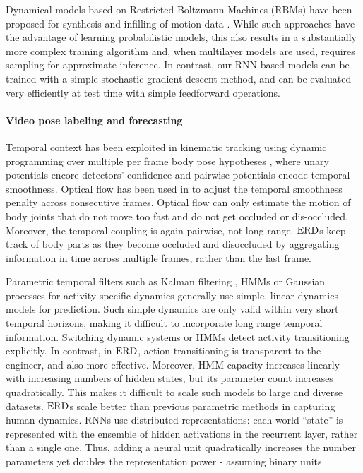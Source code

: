 \documentclass[10pt,twocolumn,letterpaper]{article}
\begin{document}
Dynamical models based on Restricted Boltzmann Machines (RBMs) have been proposed for synthesis and infilling of motion data \cite{thr-mhmub-06,sht-rtrbm-08,th-fcrbm-09,DBLP:conf/cvpr/TaylorSFH10}. While such approaches have the advantage of learning probabilistic models, this also results in a substantially more complex training algorithm and, when multilayer models are used, requires sampling for approximate inference. In contrast, our RNN-based models can be trained with a simple stochastic gradient descent method, and can be evaluated very efficiently at test time with simple feedforward operations. 


\paragraph{Video pose labeling and forecasting}
Temporal context has been exploited in kinematic  tracking using  dynamic programming over multiple per frame body pose hypotheses \cite{DBLP:conf/iccv/ParkR11,Batra:2012:DMS:2403138.2403140}, where unary potentials encore detectors' confidence and pairwise potentials encode temporal smoothness. Optical flow has been used  in \cite{conf/cvpr/SappWT11,Sigal:2012:LPE:2205801.2205829} to adjust the temporal smoothness penalty  across consecutive frames. Optical flow can only estimate the motion of body joints that do not move too fast and do not get occluded or dis-occluded. Moreover, the temporal coupling is again pairwise, not long range. $\text{ERD}$s keep track of body parts as they become occluded and disoccluded  by aggregating information  in time across multiple frames, rather than the last frame.  





Parametric  temporal filters such as Kalman filtering \cite{Weng:2006:VOT:1223195.1223208},   
HMMs or  Gaussian processes for activity specific dynamics \cite{Urtasun:2006:PTG:1153170.1153448,unified,Sminchisescu05discriminativedensity}  generally use simple, linear dynamics models for  prediction.  Such simple dynamics are only valid within very short temporal horizons, making it difficult to incorporate long range temporal information. Switching dynamic systems or HMMs \cite{prm-lslmh-00,Fox:IEEESPM2010} detect activity transitioning explicitly. In contrast, in $\text{ERD}$,  action transitioning  is transparent to the engineer, and also more effective. Moreover, HMM capacity increases linearly with increasing numbers of hidden states, but its parameter count increases quadratically. This makes it difficult to scale such models to large and diverse datasets.  
$\text{ERD}$s scale better than previous parametric methods in capturing human dynamics. RNNs use distributed representations:  each world ``state'' is represented with the ensemble of hidden activations in the recurrent layer, rather than a single one. Thus,  adding a neural unit quadratically increases the number parameters yet  doubles the representation power - assuming binary  units. 
\end{document}
